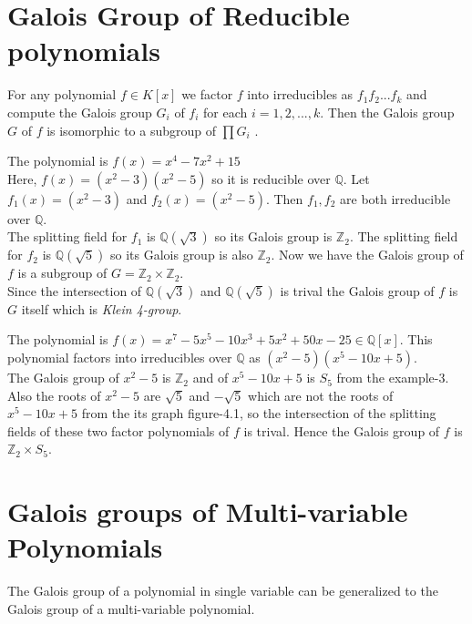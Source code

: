 \section{Galois Group of Reducible polynomials}
For any polynomial \(f \in K[x]\) we factor \(f\) into irreducibles as \(f_1f_2...f_k\) and compute the Galois group \(G_i\)  of \(f_i\) for each \(i=1,2,...,k\). Then the Galois group \(G\) of \(f\) is isomorphic to a subgroup of \(\prod G_i\) \cite{algorithm}.\\

\begin{example}
  The polynomial is \(f(x) = x^4-7x^2+15\)\\
  Here, \(f(x)=(x^2-3)(x^2-5)\) so it is reducible over \(\mathbb{Q}\). Let \(f_1(x)=(x^2-3)\) and \(f_2(x)=(x^2-5)\). Then \(f_1,f_2\) are both irreducible over \(\mathbb{Q}\).\\

  The splitting field for \(f_1\) is \(\mathbb{Q}(\sqrt{3})\) so its Galois group is \({\mathbb{Z}}_2\). The splitting field for \(f_2\) is \(\mathbb{Q}(\sqrt{5})\) so its Galois group is also \({\mathbb{Z}}_2\). Now we have the Galois group of \(f\) is a subgroup of \(G={\mathbb{Z}}_2 \times {\mathbb{Z}}_2\). \\

  Since the intersection of \(\mathbb{Q}(\sqrt{3})\) and \(\mathbb{Q}(\sqrt{5})\) is trival the Galois group of \(f\) is \(G\) itself which is \textit{Klein 4-group}.
\end{example}

\begin{example}
  The polynomial is \(f(x)=x^7-5x^5-10x^3+5x^2+50x-25 \in \mathbb{Q}[x]\). This polynomial factors into irreducibles over \(\mathbb{Q}\) as \((x^2-5)(x^5-10x+5)\).\\
  The Galois group of \(x^2-5\) is \({\mathbb{Z}}_2\) and of \(x^5-10x+5\) is \(S_5\) from the example-3. Also the roots of \(x^2-5\) are \(\sqrt{5}\) and \(-\sqrt{5}\) which are not the roots of \(x^5-10x+5\) from the its graph figure-4.1, so the intersection of the splitting fields of these two factor polynomials of \(f\) is trival. Hence the Galois group of \(f\) is \(\mathbb{Z}_2 \times S_5\).
\end{example}

\vspace{7mm}
\section{Galois groups of Multi-variable Polynomials}
The Galois group of a polynomial in single variable can be generalized to the Galois group of a multi-variable polynomial.\\

